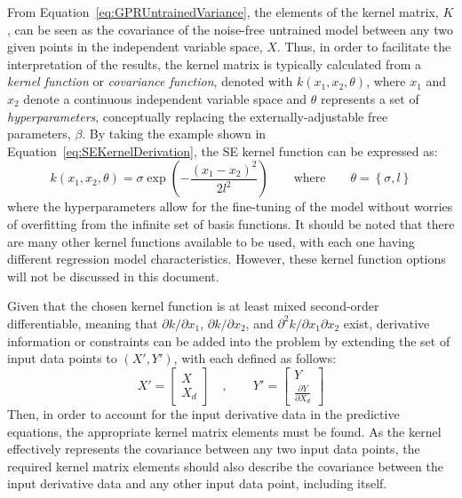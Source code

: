 \documentclass{article}
\begin{document}
From Equation~\eqref{eq:GPRUntrainedVariance}, the elements of the kernel matrix, $K$, can be seen as the covariance of the noise-free untrained model between any two given points in the independent variable space, $X$. Thus, in order to facilitate the interpretation of the results, the kernel matrix is typically calculated from a \emph{kernel function} or \emph{covariance function}, denoted with $k\!\left(x_1,x_2,\theta\right)$, where $x_1$ and $x_2$ denote a continuous independent variable space and $\theta$ represents a set of \emph{hyperparameters}, conceptually replacing the externally-adjustable free parameters, $\beta$. By taking the example shown in Equation~\eqref{eq:SEKernelDerivation}, the SE kernel function can be expressed as:
\begin{equation}
\label{eq:SEKernelFunction}
	k\!\left(x_1,x_2,\theta\right) = \sigma \exp\!\left(-\frac{\left(x_1 - x_2\right)^2}{2 l^2}\right) \qquad \text{where}  \qquad \theta = \left\lbrace \sigma,l \right\rbrace
\end{equation}
where the hyperparameters allow for the fine-tuning of the model without worries of overfitting from the infinite set of basis functions. It should be noted that there are many other kernel functions available to be used, with each one having different regression model characteristics. However, these kernel function options will not be discussed in this document.

Given that the chosen kernel function is at least mixed second-order differentiable, meaning that $\partial k / \partial x_1$, $\partial k / \partial x_2$, and $\partial^2 k / \partial x_1 \partial x_2$ exist, derivative information or constraints can be added into the problem by extending the set of input data points to $\left(X',Y'\right)$, with each defined as follows:
\begin{equation}
\label{eq:DerivativeConstraintInputExtension}
	X' =
	\begin{bmatrix}
	X \\ X_d
	\end{bmatrix}
	\quad, \qquad
	Y' =
	\begin{bmatrix}
	Y \\ \frac{\partial Y}{\partial X_d}
	\end{bmatrix}
\end{equation}
Then, in order to account for the input derivative data in the predictive equations, the appropriate kernel matrix elements must be found. As the kernel effectively represents the covariance between any two input data points, the required kernel matrix elements should also describe the covariance between the input derivative data and any other input data point, including itself.
\end{document}
